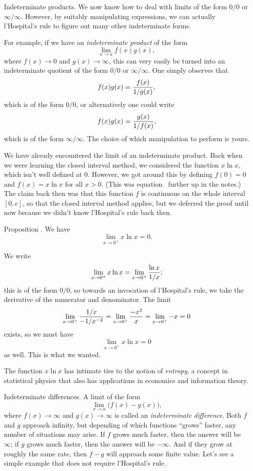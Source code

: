 \medskip\boldlabel Indeterminate products.
We now know how to deal with limits of the form $0/0$ or $\infty/\infty$. However, by suitably manipulating
expressions, we can actually l'Hospital's rule to figure out many other indeterminate forms.

For example, if we have an {\it indeterminate product} of the form
$$\lim_{x\to a} f(x) g(x),$$
where $f(x) \to 0$ and $g(x)\to \infty$, this can very easily be turned into an indeterminate quotient
of the form $0/0$ or $\infty/\infty$. One simply observes that
$$ f(x) g(x) = {f(x)\over 1/g(x)},$$
which is of the form $0/0$, or alternatively one could write
$$ f(x) g(x) = {g(x)\over 1/f(x)},$$
which is of the form $\infty/\infty$. The choice of which manipulation to perform is yours.

We have already encountered the limit of an indeterminate product.
Back when we were learning the closed interval method, we considered the function
$x\ln x$, which isn't well defined at $0$. However, we got around this by defining $f(0) = 0$ and
$f(x) = x\ln x$ for all $x>0$. (This was equation~ further up in the notes.)
The claim back then was that this function $f$ is continuous on the whole
interval $[0,e]$, so that the closed interval method applies, but we deferred the proof until now
because we didn't know l'Hospital's rule back then.

\edef\propentropylimit{\the\thmcount}
\proclaim Proposition \advthm. We have
$$\lim_{x\to 0^+} x\ln x = 0.$$

\proof We write
$$\lim_{x\to 0^+} x\ln x = \lim_{x\to 0^+} {\ln x\over 1/x};$$
this is of the form $0/0$, so towards an invocation of l'Hospital's rule,
we take the derivative of the numerator and denominator. The limit
$$\lim_{x\to 0^+} {1/x \over -1/x^{-2}} = \lim_{x\to 0^+} {-x^2\over x} = \lim_{x\to 0^+} -x = 0$$
exists, so we must have
$$\lim_{x\to 0^+} x\ln x = 0$$
as well. This is what we wanted.\slug

The function $x\ln x$ has intimate ties to the notion of {\it entropy}, a concept in statistical physics
that also has applications in economics and information theory.

\medskip\boldlabel Indeterminate differences. A limit of the form
$$\lim_{x\to a} \bigl( f(x) - g(x)\bigr),$$
where $f(x) \to \infty$ and $g(x) \to \infty$ is called an {\it indeterminate difference}. Both $f$ and
$g$ approach infinity, but depending of which functions ``grows'' faster, any number of situations may arise.
If $f$ grows much faster, then the answer will be $\infty$; if $g$ grows much faster, then the answer will
be $-\infty$. And if they grow at roughly the same rate, then $f-g$ will approach some finite value.
Let's see a simple example that does not require l'Hospital's rule.

